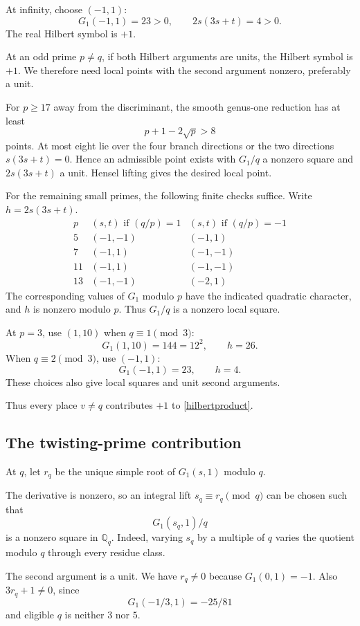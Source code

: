 \documentclass[11pt]{article}
\newcommand{\Q}{\mathbb Q}
\begin{document}
At infinity, choose $(-1,1)$:
\[
G_1(-1,1)=23>0,\qquad
2s(3s+t)=4>0.
\]
The real Hilbert symbol is $+1$.

At an odd prime $p\ne q$, if both Hilbert
arguments are units, the Hilbert symbol is $+1$.
We therefore need local points with the second
argument nonzero, preferably a unit.

For $p\ge17$ away from the discriminant,
the smooth genus-one reduction has at least
\[
p+1-2\sqrt p>8
\]
points.
At most eight lie over the four branch
directions or the two directions
$s(3s+t)=0$.
Hence an admissible point exists with
$G_1/q$ a nonzero square and
$2s(3s+t)$ a unit.
Hensel lifting gives the desired local point.

For the remaining small primes, the following
finite checks suffice.
Write $h=2s(3s+t)$.
\[
\begin{array}{c|cc}
p&
(s,t)\text{ if }(q/p)=1&
(s,t)\text{ if }(q/p)=-1\\ \hline
5&(-1,-1)&(-1,1)\\
7&(-1,1)&(-1,-1)\\
11&(-1,1)&(-1,-1)\\
13&(-1,-1)&(-2,1)
\end{array}
\]
The corresponding values of $G_1$ modulo $p$
have the indicated quadratic character, and
$h$ is nonzero modulo $p$.
Thus $G_1/q$ is a nonzero local square.

At $p=3$, use $(1,10)$ when $q\equiv1\pmod3$:
\[
G_1(1,10)=144=12^2,\qquad h=26.
\]
When $q\equiv2\pmod3$, use $(-1,1)$:
\[
G_1(-1,1)=23,\qquad h=4.
\]
These choices also give local squares and unit
second arguments.

Thus every place $v\ne q$ contributes $+1$
to \eqref{hilbertproduct}.

\subsection{The twisting-prime contribution}

At $q$, let $r_q$ be the unique simple root
of $G_1(s,1)$ modulo $q$.

The derivative is nonzero, so an integral lift
$s_q\equiv r_q\pmod q$ can be chosen such that
\[
G_1(s_q,1)/q
\]
is a nonzero square in $\Q_q$.
Indeed, varying $s_q$ by a multiple of $q$
varies the quotient modulo $q$ through every
residue class.

The second argument is a unit.
We have $r_q\ne0$ because $G_1(0,1)=-1$.
Also $3r_q+1\ne0$, since
\[
G_1(-1/3,1)=-25/81
\]
and eligible $q$ is neither $3$ nor $5$.
\end{document}
